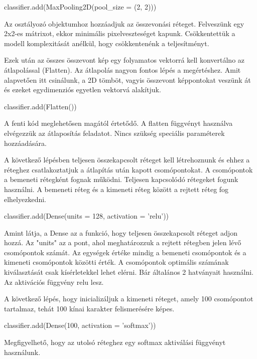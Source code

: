 \begin{python}
classifier.add(MaxPooling2D(pool_size = (2, 2)))
\end{python}

Az osztályozó objektumhoz hozzáadjuk az összevonási réteget. Felveszünk egy 2x2-es mátrixot, ekkor minimális pixelveszteséget kapunk. Csökkentettük a modell komplexitását anélkül, hogy csökkentenénk a teljesítményt.

Ezek után az összes összevont kép egy folyamatos vektorrá kell konvertálno az átlapolással (Flatten). Az átlapolás nagyon fontos lépés a megértéshez. Amit alapvetően itt csinálunk, a 2D tömböt, vagyis összevont képpontokat veszünk át és ezeket egydimenziós egyetlen vektorvá alakítjuk.

\begin{python}
classifier.add(Flatten())
\end{python}

A fenti kód meglehetősen magától értetődő. A flatten függvényt használva elvégezzük az átlaposítás feladatot. Nincs szükség speciális paraméterek hozzáadására.

A következő lépésben teljesen összekapcsolt réteget kell létrehoznunk és ehhez a réteghez csatlakoztatjuk a átlapítás után kapott csomópontokat. A csomópontok a bemeneti rétegként fognak működni. Teljesen kapcsolódó rétegeket fogunk használni. A bemeneti réteg és a kimeneti réteg között a rejtett réteg fog elhelyezkedni.

\begin{python}
classifier.add(Dense(units = 128, activation = 'relu'))
\end{python}

Amint látja, a Dense az a funkció, hogy teljesen összekapcsolt réteget adjon hozzá. Az "units" az a pont, ahol meghatározzuk a rejtett rétegben jelen lévő csomópontok számát. Az egységek értéke mindig a bemeneti csomópontok és a kimeneti csomópontok közötti érték. A csomópontok optimális számának kiválasztását csak kísérletekkel lehet elérni. Bár általános 2 hatványait használni. Az aktivációs függvény relu lesz.

A következő lépés, hogy inicializáljuk a kimeneti réteget, amely 100 csomópontot tartalmaz, tehát 100 kínai karakter felismerésére képes.

\begin{python}
classifier.add(Dense(100, activation = 'softmax'))
\end{python}

Megfigyelhető, hogy az utolsó réteghez egy softmax aktiválási függvényt használunk.

